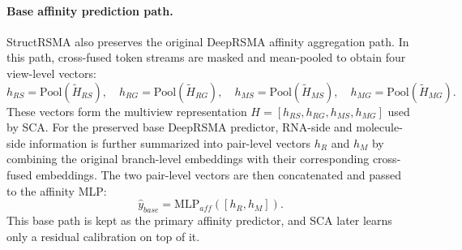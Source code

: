 \documentclass[journal=jcisd8,manuscript=article]{achemso}
\begin{document}
\paragraph{Base affinity prediction path.}
StructRSMA also preserves the original DeepRSMA affinity aggregation path. In this path, cross-fused token streams are masked and mean-pooled to obtain four view-level vectors:
\begin{equation}
h_{RS}=\mathrm{Pool}(\tilde{H}_{RS}),\quad
h_{RG}=\mathrm{Pool}(\tilde{H}_{RG}),\quad
h_{MS}=\mathrm{Pool}(\tilde{H}_{MS}),\quad
h_{MG}=\mathrm{Pool}(\tilde{H}_{MG}).
\end{equation}
These vectors form the multiview representation $H=[h_{RS},h_{RG},h_{MS},h_{MG}]$ used by SCA. For the preserved base DeepRSMA predictor, RNA-side and molecule-side information is further summarized into pair-level vectors $h_R$ and $h_M$ by combining the original branch-level embeddings with their corresponding cross-fused embeddings. The two pair-level vectors are then concatenated and passed to the affinity MLP:
\begin{equation}
\hat{y}_{base} = \mathrm{MLP}_{aff}([h_R,h_M]).
\end{equation}
This base path is kept as the primary affinity predictor, and SCA later learns only a residual calibration on top of it.
\end{document}

